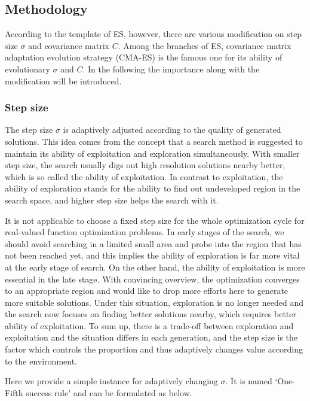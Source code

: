 \subsection{Methodology}

According to the template of ES, however, there are various modification
on step size $\sigma$ and covariance matrix $C$.  Among the branches of
ES, covariance matrix adaptation evolution strategy (CMA-ES) is the
famous one for its ability of evolutionary $\sigma$ and $C$.  In the
following the importance along with the modification will be introduced.

\subsubsection{Step size}

The step size $\sigma$ is adaptively adjusted according to the quality
of generated solutions.  This idea comes from the concept that a search
method is suggested to maintain its ability of exploitation and
exploration simultaneously.  With smaller step size, the search usually
digs out high resolution solutions nearby better, which is so called the
ability of exploitation.  In contrast to exploitation, the ability of
exploration stands for the ability to find out undeveloped region in the
search space, and higher step size helps the search with it.

It is not applicable to choose a fixed step size for the whole
optimization cycle for real-valued function optimization problems.  In
early stages of the search, we should avoid searching in a limited small
area and probe into the region that has not been reached yet, and this
implies the ability of exploration is far more vital at the early stage
of search.  On the other hand, the ability of exploitation is more
essential in the late stage.  With convincing overview, the optimization
converges to an appropriate region and would like to drop more efforts
here to generate more suitable solutions.  Under this situation,
exploration is no longer needed and the search now focuses on finding
better solutions nearby, which requires better ability of exploitation.
To sum up, there is a trade-off between exploration and exploitation and
the situation differs in each generation, and the step size is the
factor which controls the proportion and thus adaptively changes value
according to the environment.

Here we provide a simple instance for adaptively changing $\sigma$.  It
is named `One-Fifth success rule' and can be formulated as below.

